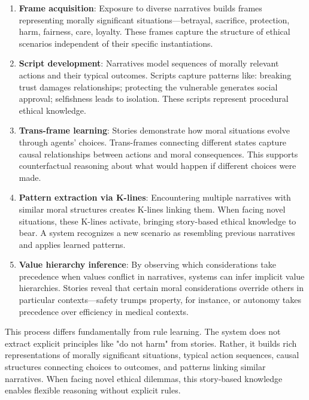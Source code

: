\documentclass[12pt]{article}
\begin{document}
\begin{enumerate}
\item \textbf{Frame acquisition}: Exposure to diverse narratives builds frames representing morally significant situations—betrayal, sacrifice, protection, harm, fairness, care, loyalty. These frames capture the structure of ethical scenarios independent of their specific instantiations.

\item \textbf{Script development}: Narratives model sequences of morally relevant actions and their typical outcomes. Scripts capture patterns like: breaking trust damages relationships; protecting the vulnerable generates social approval; selfishness leads to isolation. These scripts represent procedural ethical knowledge.

\item \textbf{Trans-frame learning}: Stories demonstrate how moral situations evolve through agents' choices. Trans-frames connecting different states capture causal relationships between actions and moral consequences. This supports counterfactual reasoning about what would happen if different choices were made.

\item \textbf{Pattern extraction via K-lines}: Encountering multiple narratives with similar moral structures creates K-lines linking them. When facing novel situations, these K-lines activate, bringing story-based ethical knowledge to bear. A system recognizes a new scenario as resembling previous narratives and applies learned patterns.

\item \textbf{Value hierarchy inference}: By observing which considerations take precedence when values conflict in narratives, systems can infer implicit value hierarchies. Stories reveal that certain moral considerations override others in particular contexts—safety trumps property, for instance, or autonomy takes precedence over efficiency in medical contexts.
\end{enumerate}

This process differs fundamentally from rule learning. The system does not extract explicit principles like "do not harm" from stories. Rather, it builds rich representations of morally significant situations, typical action sequences, causal structures connecting choices to outcomes, and patterns linking similar narratives. When facing novel ethical dilemmas, this story-based knowledge enables flexible reasoning without explicit rules.
\end{document}
